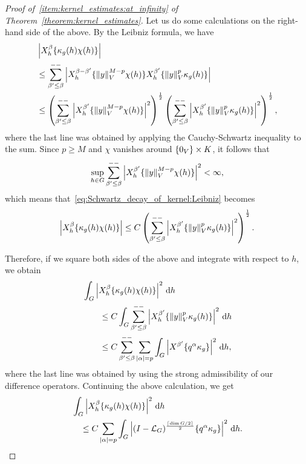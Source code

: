 \begin{proof}[Proof of~\ref{item:kernel_estimates:at_infinity} of Theorem~\ref{theorem:kernel_estimates}]
    Let us do some calculations on the right-hand side of the above.
    By the Leibniz formula, we have
    \begin{align}
        &\abs {\LeftDifferentialOperator [h] \beta \{\kappa_g(h) \chi(h)\}} \notag\\
        &\leq \lcsum {\beta' \leq \beta} \abs{\LeftDifferentialOperator [h] {\beta - \beta'} \{\norm y^{M - p} \chi(h)\} \LeftDifferentialOperator [h] {\beta'} \{\norm y^p \kappa_g(h)\}} \notag\\
        &\leq
        \left(\lcsum {\beta' \leq \beta} \abs{\LeftDifferentialOperator [h] {\beta'} \{\norm y^{M - p} \chi(h)\}}^2\right)^{\frac 1 2}
        \left(\lcsum {\beta' \leq \beta} \abs{\LeftDifferentialOperator [h] {\beta'} \{\norm y^p \kappa_g(h)\}}^2\right)^{\frac 1 2},
        \label{eq:Schwartz_decay_of_kernel:Leibniz}
    \end{align}
    where the last line was obtained by applying the Cauchy-Schwartz inequality to the sum.
    Since $p \geq M$ and $\chi$ vanishes around $\{0_V\} \times K$,
    it follows that
    \begin{align*}
        \sup_{h \in \Group} \lcsum {\beta' \leq \beta} \abs{\LeftDifferentialOperator [h] {\beta'} \{\norm y^{M - p} \chi(h)\}}^2 < \infty,
    \end{align*}
    which means that~\eqref{eq:Schwartz_decay_of_kernel:Leibniz} becomes
    \begin{align*}
        \abs {\LeftDifferentialOperator [h] \beta \{\kappa_g(h) \chi(h)\}}
        \leq C \left(\lcsum {\beta' \leq \beta} \abs{\LeftDifferentialOperator [h] {\beta'} \{\norm y^p \kappa_g(h)\}}^2\right)^{\frac 1 2}.
    \end{align*}

    Therefore, if we square both sides of the above and integrate with respect to $h$, we obtain
    \begin{align*}
        &\int_\Group \abs {\LeftDifferentialOperator [h] \beta \{\kappa_g(h) \chi(h)\}}^2 \dd h\\
        &\qquad \leq C \int_\Group \lcsum {\beta' \leq \beta} \abs{\LeftDifferentialOperator [h] {\beta'} \{\norm y^p \kappa_g(h)\}}^2 \dd h\\
        &\qquad \leq C \lcsum {\beta' \leq \beta} \sum_{\abs \alpha = p} \int_\Group \abs{\LeftDifferentialOperator {\beta'} \{q^\alpha \kappa_g\}}^2 \dd h,
    \end{align*}
    where the last line was obtained by using the strong admissibility of our difference operators.
    Continuing the above calculation,
    we get
    \begin{align*}
        &\int_\Group \abs {\LeftDifferentialOperator [h] \beta \{\kappa_g(h) \chi(h)\}}^2 \dd h\\
        &\quad \leq C \sum_{\abs \alpha = p} \int_\Group \abs{\BesselPotential {\Ceiling {\dim \Group / 2}} \{q^\alpha \kappa_g\}}^2 \dd h.
    \end{align*}


\end{proof}
